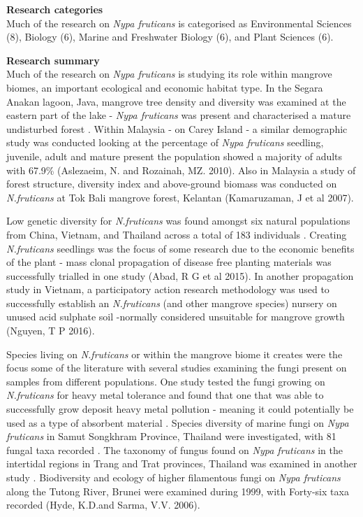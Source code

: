 \documentclass[]{book}
\theoremstyle{definition}
\theoremstyle{definition}
\theoremstyle{definition}
\theoremstyle{remark}
\begin{document}
\textbf{Research categories}\\
Much of the research on \emph{Nypa fruticans} is categorised as
Environmental Sciences (8), Biology (6), Marine and Freshwater Biology
(6), and Plant Sciences (6).

\textbf{Research summary}\\
Much of the research on \emph{Nypa fruticans} is studying its role
within mangrove biomes, an important ecological and economic habitat
type. In the Segara Anakan lagoon, Java, mangrove tree density and
diversity was examined at the eastern part of the lake - \emph{Nypa
fruticans} was present and characterised a mature undisturbed forest
\citep{Hinrichs_2008}. Within Malaysia - on Carey Island - a similar
demographic study was conducted looking at the percentage of \emph{Nypa
fruticans} seedling, juvenile, adult and mature present the population
showed a majority of adults with 67.9\% (Aslezaeim, N. and Rozainah, MZ.
2010). Also in Malaysia a study of forest structure, diversity index and
above-ground biomass was conducted on \emph{N.fruticans} at Tok Bali
mangrove forest, Kelantan (Kamaruzaman, J et al 2007).

Low genetic diversity for \emph{N.fruticans} was found amongst six
natural populations from China, Vietnam, and Thailand across a total of
183 individuals \citep{Jian_2010}. Creating \emph{N.fruticans} seedlings
was the focus of some research due to the economic benefits of the plant
- mass clonal propagation of disease free planting materials was
successfully trialled in one study (Abad, R G et al 2015). In another
propagation study in Vietnam, a participatory action research
methodology was used to successfully establish an \emph{N.fruticans}
(and other mangrove species) nursery on unused acid sulphate soil
-normally considered unsuitable for mangrove growth (Nguyen, T P 2016).

Species living on \emph{N.fruticans} or within the mangrove biome it
creates were the focus some of the literature with several studies
examining the fungi present on samples from different populations. One
study tested the fungi growing on \emph{N.fruticans} for heavy metal
tolerance and found that one that was able to successfully grow deposit
heavy metal pollution - meaning it could potentially be used as a type
of absorbent material \citep{Choo_2015}. Species diversity of marine
fungi on \emph{Nypa fruticans} in Samut Songkhram Province, Thailand
were investigated, with 81 fungal taxa recorded
\citep{Pilantanapak_2005}. The taxonomy of fungus found on \emph{Nypa
fruticans} in the intertidal regions in Trang and Trat provinces,
Thailand was examined in another study \citep{Suetrong_2015}.
Biodiversity and ecology of higher filamentous fungi on \emph{Nypa
fruticans} along the Tutong River, Brunei were examined during 1999,
with Forty-six taxa recorded (Hyde, K.D.and Sarma, V.V. 2006).
\end{document}
